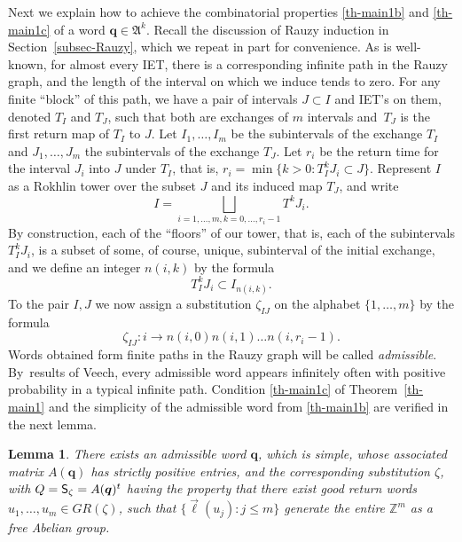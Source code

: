 \documentclass[11pt]{article}
\numberwithin{equation}{section}\newcommand{\Relation}[2][]{}\newtheorem*{prop*}{Proposition}
\newcommand{\sep}{:}
\theoremstyle{plain}
\newtheorem{lemma}[theorem]{Lemma}
\theoremstyle{definition}
\newcommand \q {{\boldsymbol q}}
\newcommand\bq{{\boldsymbol q}}
\newcommand\FrA{\mathfrak{A}}
\newcommand{\Z}{\mathbb{Z}}
\newcommand\Sf{{\sf S}}
\begin{document}
Next we explain how to achieve the combinatorial properties \eqref{th-main1b} and \eqref{th-main1c} of a word $\bq\in \FrA^k$. Recall the discussion of Rauzy induction in Section~\ref{subsec-Rauzy}, which we repeat in part for convenience.
As is well-known, for almost every IET, there is a corresponding infinite path in the Rauzy graph, and the length of the interval on which we induce tends to zero. For any finite ``block'' of this path, we
have a pair of intervals $J\subset I$ and IET's on them, denoted $T_I$ and $T_J$, such that both are
exchanges of $m$ intervals and~$T_J$ is the first return map of $T_I$ to $J$. Let $I_1, \dots, I_m$ be the subintervals of the exchange $T_I$ and $J_1, \dots, J_m$ the subintervals of the exchange $T_J$.
Let $r_i$ be the return time for the interval $J_i$ into $J$ under $T_I$, that is,
$
r_i=\min\{ k>0: T_I^kJ_i\subset J\}.
$
Represent $I$ as a Rokhlin tower over the subset $J$ and its induced map $T_J$, and write
\[
I=\bigsqcup\limits_{i=1,\dots, m, k=0, \dots, r_i-1} T^{k}J_i.
\]
By construction, each of the ``floors'' of our tower, that is, each of the subintervals $T_I^{k}J_i$, is a subset of some, of course, unique, subinterval of the initial exchange, and we define an integer $n(i,k)$ by the formula
\[
T_I^{k}J_i\subset I_{n(i,k)}.
\]
To the pair $I,J$ we now assign a substitution $\zeta_{IJ}$ on the alphabet
$\{1, \dots, m\}$ by the formula
\begin{equation} \label{zeta-def}
\zeta_{IJ}: i\to n(i,0)n(i,1)\dots n(i, r_i-1).
\end{equation}
Words obtained form finite paths in the Rauzy graph will be called \emph{admissible}. By~\hbox{results} of Veech, every admissible word appears infinitely often with positive probability in a typical infinite path. Condition \eqref{th-main1c} of Theorem~\ref{th-main1} and the simplicity of the admissible word from \eqref{th-main1b} are verified in the next lemma.
\begin{lemma} \label{lem-combi1}
There exists an admissible word $\bq$, which is \emph{simple}, whose associated matrix $A(\q)$ has strictly positive entries, and the corresponding substitution $\zeta$, with $Q = \Sf_\zeta=A(\q)^t$ having the property that there exist \emph{good return words}
$u_1,\ldots,u_m\in GR(\zeta)$, such that $\{\vec{\ell}(u_j)\sep j\le m\}$ generate the entire
$\Z^m$ as a free Abelian group.
\end{lemma}
\end{document}
